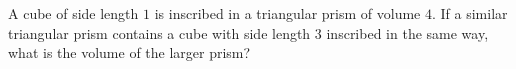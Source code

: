 A cube of side length $1$ is inscribed in a triangular prism of volume $4$. If a similar triangular prism contains a cube with side length $3$ inscribed in the same way, what is the volume of the larger prism?
